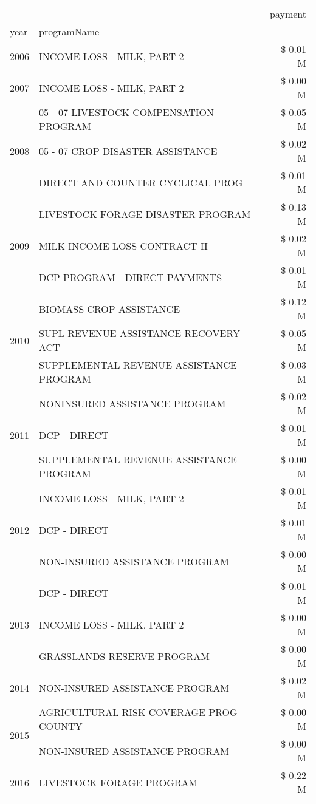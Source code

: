 \begin{tabular}{llr}
\toprule
 &  & payment \\
year & programName &  \\
\midrule
2006 & INCOME LOSS - MILK, PART 2 & \$ 0.01 M \\
\cline{1-3}
2007 & INCOME LOSS - MILK, PART 2 & \$ 0.00 M \\
\cline{1-3}
\multirow[t]{3}{*}{2008} & 05 - 07 LIVESTOCK COMPENSATION PROGRAM & \$ 0.05 M \\
 & 05 - 07 CROP DISASTER ASSISTANCE & \$ 0.02 M \\
 & DIRECT AND COUNTER CYCLICAL PROG & \$ 0.01 M \\
\cline{1-3}
\multirow[t]{3}{*}{2009} & LIVESTOCK FORAGE DISASTER  PROGRAM & \$ 0.13 M \\
 & MILK INCOME LOSS CONTRACT II & \$ 0.02 M \\
 & DCP PROGRAM - DIRECT PAYMENTS & \$ 0.01 M \\
\cline{1-3}
\multirow[t]{3}{*}{2010} & BIOMASS CROP ASSISTANCE & \$ 0.12 M \\
 & SUPL REVENUE ASSISTANCE RECOVERY ACT & \$ 0.05 M \\
 & SUPPLEMENTAL REVENUE ASSISTANCE PROGRAM & \$ 0.03 M \\
\cline{1-3}
\multirow[t]{3}{*}{2011} & NONINSURED ASSISTANCE PROGRAM & \$ 0.02 M \\
 & DCP - DIRECT & \$ 0.01 M \\
 & SUPPLEMENTAL REVENUE ASSISTANCE PROGRAM & \$ 0.00 M \\
\cline{1-3}
\multirow[t]{3}{*}{2012} & INCOME LOSS - MILK, PART 2 & \$ 0.01 M \\
 & DCP - DIRECT & \$ 0.01 M \\
 & NON-INSURED ASSISTANCE PROGRAM & \$ 0.00 M \\
\cline{1-3}
\multirow[t]{3}{*}{2013} & DCP - DIRECT & \$ 0.01 M \\
 & INCOME LOSS - MILK, PART 2 & \$ 0.00 M \\
 & GRASSLANDS RESERVE PROGRAM & \$ 0.00 M \\
\cline{1-3}
2014 & NON-INSURED ASSISTANCE PROGRAM & \$ 0.02 M \\
\cline{1-3}
\multirow[t]{2}{*}{2015} & AGRICULTURAL RISK COVERAGE PROG - COUNTY & \$ 0.00 M \\
 & NON-INSURED ASSISTANCE PROGRAM & \$ 0.00 M \\
\cline{1-3}
\multirow[t]{3}{*}{2016} & LIVESTOCK FORAGE PROGRAM                      & \$ 0.22 M \\

\end{tabular}

